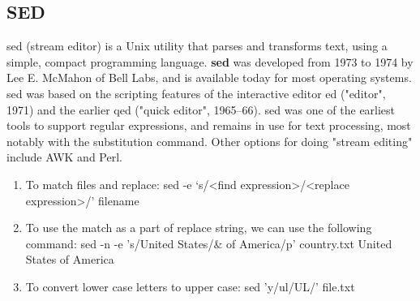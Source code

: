 \documentclass{beamer}
\begin{document}
\begin{frame}
    \subsection{SED}
    sed (stream editor) is a Unix utility that parses and transforms text, using a simple, compact programming language. \textbf{sed} was developed from 1973 to 1974 by Lee E. McMahon of Bell Labs, and is available today for most operating systems. sed was based on the scripting features of the interactive editor ed ("editor", 1971) and the earlier qed ("quick editor", 1965–66). sed was one of the earliest tools to support regular expressions, and remains in use for text processing, most notably with the substitution command. Other options for doing "stream editing" include AWK and Perl.
\end{frame}
\begin{frame}

    \begin{enumerate}
        \item
            To match files and replace:
                     sed  -e   ‘s/<find expression>/<replace expression>/’ filename
        \item
            To use the match as a part of replace string, we can use the following command:
                    sed -n -e  's/United States/& of America/p' country.txt
                    United States of America
          \item
            To convert lower case letters to upper case:
                    sed 'y/ul/UL/' file.txt
  \end{enumerate}
\end{frame}
\end{document}
